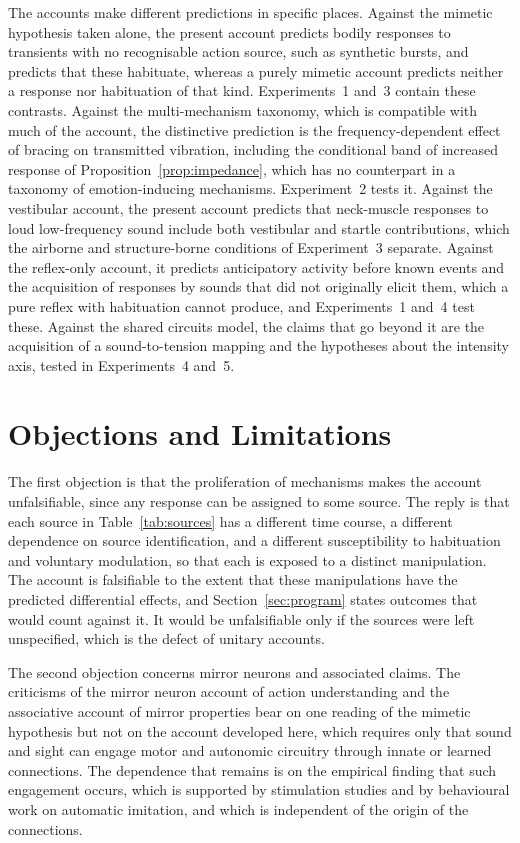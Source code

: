 \documentclass[11pt]{article}
\theoremstyle{plain}
\theoremstyle{definition}
\begin{document}
The accounts make different predictions in specific places. Against the mimetic hypothesis taken alone, the present account predicts bodily responses to transients with no recognisable action source, such as synthetic bursts, and predicts that these habituate, whereas a purely mimetic account predicts neither a response nor habituation of that kind. Experiments~1 and~3 contain these contrasts. Against the multi-mechanism taxonomy, which is compatible with much of the account, the distinctive prediction is the frequency-dependent effect of bracing on transmitted vibration, including the conditional band of increased response of Proposition~\ref{prop:impedance}, which has no counterpart in a taxonomy of emotion-inducing mechanisms. Experiment~2 tests it. Against the vestibular account, the present account predicts that neck-muscle responses to loud low-frequency sound include both vestibular and startle contributions, which the airborne and structure-borne conditions of Experiment~3 separate. Against the reflex-only account, it predicts anticipatory activity before known events and the acquisition of responses by sounds that did not originally elicit them, which a pure reflex with habituation cannot produce, and Experiments~1 and~4 test these. Against the shared circuits model, the claims that go beyond it are the acquisition of a sound-to-tension mapping and the hypotheses about the intensity axis, tested in Experiments~4 and~5.

\section{Objections and Limitations}\label{sec:objections}

The first objection is that the proliferation of mechanisms makes the account unfalsifiable, since any response can be assigned to some source. The reply is that each source in Table~\ref{tab:sources} has a different time course, a different dependence on source identification, and a different susceptibility to habituation and voluntary modulation, so that each is exposed to a distinct manipulation. The account is falsifiable to the extent that these manipulations have the predicted differential effects, and Section~\ref{sec:program} states outcomes that would count against it. It would be unfalsifiable only if the sources were left unspecified, which is the defect of unitary accounts.

The second objection concerns mirror neurons and associated claims. The criticisms of the mirror neuron account of action understanding \citep{hickok2009} and the associative account of mirror properties \citep{heyes2010,heyes2022} bear on one reading of the mimetic hypothesis but not on the account developed here, which requires only that sound and sight can engage motor and autonomic circuitry through innate or learned connections. The dependence that remains is on the empirical finding that such engagement occurs, which is supported by stimulation studies and by behavioural work on automatic imitation, and which is independent of the origin of the connections.
\end{document}
